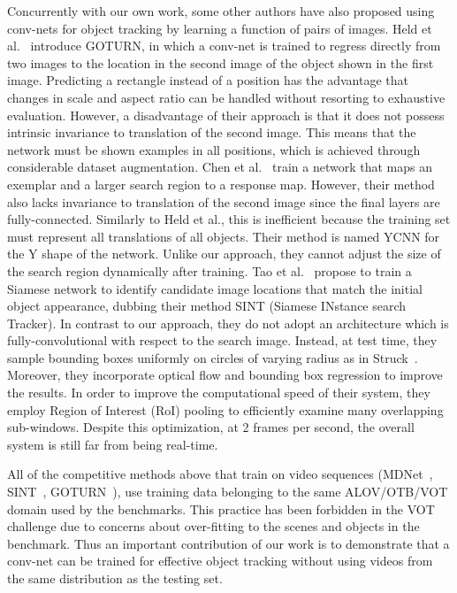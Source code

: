 \documentclass[runningheads]{llncs}
\begin{document}
Concurrently with our own work, some other authors have also proposed using conv-nets for object tracking by learning a function of pairs of images.
Held et al.~\cite{held2016learning} introduce GOTURN, in which a conv-net is trained to regress directly from two images to the location in the second image of the object shown in the first image.
Predicting a rectangle instead of a position has the advantage that changes in scale and aspect ratio can be handled without resorting to exhaustive evaluation.
However, a disadvantage of their approach is that it does not possess intrinsic invariance to translation of the second image.
This means that the network must be shown examples in all positions, which is achieved through considerable dataset augmentation.
Chen et al.~\cite{chen2016once} train a network that maps an exemplar and a larger search region to a response map.
However, their method also lacks invariance to translation of the second image since the final layers are fully-connected.
Similarly to Held et al., this is inefficient because the training set must represent all translations of all objects.
Their method is named YCNN for the Y shape of the network.
Unlike our approach, they cannot adjust the size of the search region dynamically after training.
Tao et al.~\cite{tao2016siamese} propose to train a Siamese network to identify candidate image locations that match the initial object appearance, dubbing their method SINT (Siamese INstance search Tracker).
In contrast to our approach, they do not adopt an architecture which is fully-convolutional with respect to the search image.
Instead, at test time, they sample bounding boxes uniformly on circles of varying radius as in Struck~\cite{hare2011struck}.
Moreover, they incorporate optical flow and bounding box regression to improve the results.
In order to improve the computational speed of their system, they employ Region of Interest (RoI) pooling to efficiently examine many overlapping sub-windows.
Despite this optimization, at 2 frames per second, the overall system is still far from being real-time.

All of the competitive methods above that train on video sequences (MDNet~\cite{nam2015learning}, SINT~\cite{tao2016siamese}, GOTURN~\cite{held2016learning}), use training data belonging to the same ALOV/OTB/VOT domain used by the benchmarks.
This practice has been forbidden in the VOT challenge due to concerns about over-fitting to the scenes and objects in the benchmark.
Thus an important contribution of our work is to demonstrate that a conv-net can be trained for effective object tracking without using videos from the same distribution as the testing set.
 
\end{document}
